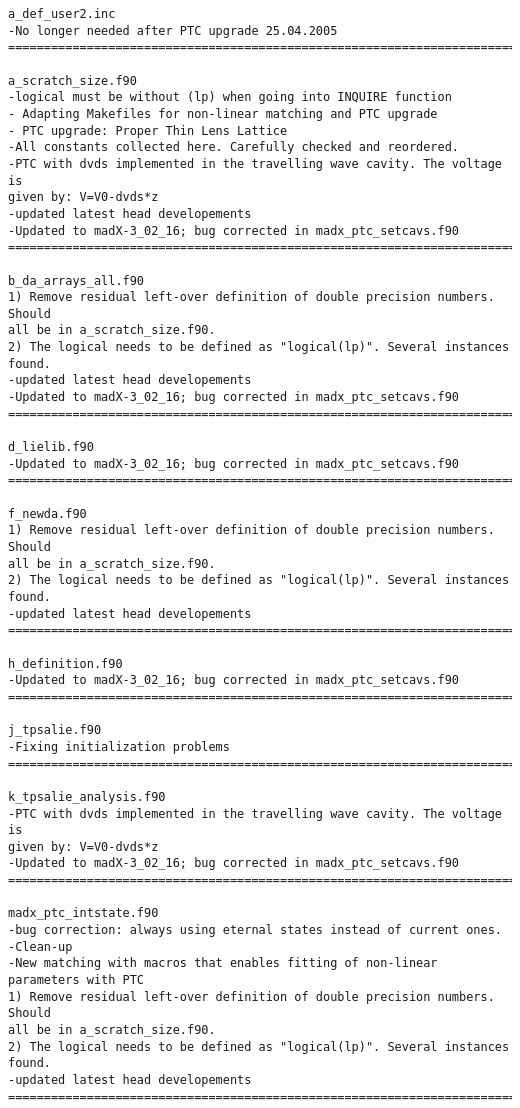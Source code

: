 \begin{verbatim}
a_def_user2.inc
-No longer needed after PTC upgrade 25.04.2005
=============================================================================

a_scratch_size.f90
-logical must be without (lp) when going into INQUIRE function
- Adapting Makefiles for non-linear matching and PTC upgrade
- PTC upgrade: Proper Thin Lens Lattice
-All constants collected here. Carefully checked and reordered.
-PTC with dvds implemented in the travelling wave cavity. The voltage is
given by: V=V0-dvds*z
-updated latest head developements
-Updated to madX-3_02_16; bug corrected in madx_ptc_setcavs.f90
=============================================================================

b_da_arrays_all.f90
1) Remove residual left-over definition of double precision numbers. Should
all be in a_scratch_size.f90.
2) The logical needs to be defined as "logical(lp)". Several instances found.
-updated latest head developements
-Updated to madX-3_02_16; bug corrected in madx_ptc_setcavs.f90
=============================================================================

d_lielib.f90
-Updated to madX-3_02_16; bug corrected in madx_ptc_setcavs.f90
=============================================================================

f_newda.f90
1) Remove residual left-over definition of double precision numbers. Should
all be in a_scratch_size.f90.
2) The logical needs to be defined as "logical(lp)". Several instances found.
-updated latest head developements
=============================================================================

h_definition.f90
-Updated to madX-3_02_16; bug corrected in madx_ptc_setcavs.f90
=============================================================================

j_tpsalie.f90
-Fixing initialization problems
=============================================================================

k_tpsalie_analysis.f90
-PTC with dvds implemented in the travelling wave cavity. The voltage is
given by: V=V0-dvds*z
-Updated to madX-3_02_16; bug corrected in madx_ptc_setcavs.f90
=============================================================================

madx_ptc_intstate.f90
-bug correction: always using eternal states instead of current ones.
-Clean-up
-New matching with macros that enables fitting of non-linear parameters with PTC
1) Remove residual left-over definition of double precision numbers. Should
all be in a_scratch_size.f90.
2) The logical needs to be defined as "logical(lp)". Several instances found.
-updated latest head developements
=============================================================================


\end{verbatim}

